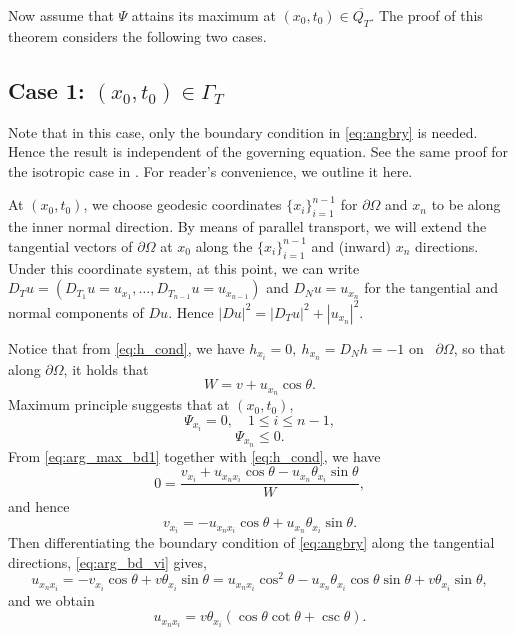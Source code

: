 \documentclass[12pt]{article}
\numberwithin{equation}{section}
\theoremstyle{plain}
\theoremstyle{definition}
\theoremstyle{remark}
\begin{document}
Now assume that $\Psi$ attains its maximum at $(x_0,t_0)\in \overline{Q_T}$.  The proof of this theorem considers the following two cases.

\subsection{Case 1: $(x_0,t_0) \in \Gamma_T$}
Note that in this case, only the
boundary condition in \eqref{eq:angbry} is needed. Hence the result is independent of the governing equation. See the same proof for the isotropic case in \cite{GMWW}. For reader's convenience, we outline it here.

At $(x_0,t_0)$, we choose geodesic coordinates $\{x_i \}_{i=1}^{n-1}$ 
for $\partial\Omega$ and $x_n $ to be along the inner normal direction. By means of parallel transport, we will extend the tangential vectors of $\partial\Omega$ at $x_0$ along the $\{x_i \}_{i=1}^{n-1}$ and (inward) $x_n $ directions. 
Under this coordinate system, at this point, we can write 
$D_Tu=(D_{T_1} u = u_{x_1}, \ldots, D_{T_{n-1}}u=u_{x_{n-1}})$ and $D_N u=u_{x_n}$ for the tangential and normal components of $Du$. Hence $|Du|^2 = |D_Tu|^2 + |u_{x_n}|^2 $.

Notice that from \eqref{eq:h_cond}, we have $ h_{x_i}=0, \ h_{x_n} = D_N h=-1$ on \ $\partial \Omega$, so that along $\partial\Omega$, it holds that
\begin{equation*}
    W = v + u_{x_n} \cos{\theta}.
\end{equation*}
Maximum principle suggests that at $(x_0,t_0)$,
\begin{equation} \label{eq:arg_max_bd1}
    \Psi_{x_i} =0, \quad 1\leq i \leq n-1,
\end{equation}
\begin{equation}  \label{eq:arg_max_bd2}
    \Psi_{x_n} \leq0.
\end{equation}
From \eqref{eq:arg_max_bd1} together with \eqref{eq:h_cond}, we have
\begin{equation*}
    0 = \frac{v_{x_i} + u_{x_n x_i} \cos{\theta} - u_{x_n} \theta_{x_i} \sin{\theta}}{W},
\end{equation*}
and hence
\begin{equation} \label{eq:arg_bd_vi}
    v_{x_i} = - u_{x_n x_i} \cos{\theta} + u_{x_n} \theta_{x_i} \sin{\theta}.
\end{equation}
Then differentiating the boundary condition of \eqref{eq:angbry} along the tangential directions, \eqref{eq:arg_bd_vi} gives,
\begin{equation*}
    u_{x_n x_i}  = - v_{x_i} \cos{\theta} + v \theta_{x_i} \sin{\theta} = u_{x_n x_i} \cos^2 \theta  - u_{x_n} \theta_{x_i} \cos{\theta} \sin{\theta} + v \theta_{x_i} \sin{\theta},
\end{equation*}
and we obtain
\begin{equation} \label{eq:arg_bd_uni}
    u_{x_n x_i} = v \theta_{x_i} (\cos{\theta} \cot{\theta} + \csc{\theta}).
\end{equation}
\end{document}
